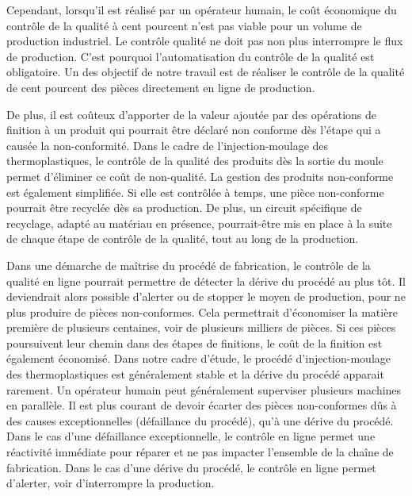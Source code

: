 Cependant, lorsqu'il est réalisé par un opérateur humain, le coût économique du contrôle de la qualité à cent pourcent n'est pas viable pour un volume de production industriel.
Le contrôle qualité ne doit pas non plus interrompre le flux de production.
C'est pourquoi l'automatisation du contrôle de la qualité est obligatoire.
Un des objectif de notre travail est de réaliser le contrôle de la qualité de cent pourcent des pièces directement en ligne de production.

De plus, il est coûteux d'apporter de la valeur ajoutée par des opérations de finition à un produit qui pourrait être déclaré non conforme dès l'étape qui a causée la non-conformité.
Dans le cadre de l'injection-moulage des thermoplastiques, le contrôle de la qualité des produits dès la sortie du moule permet d'éliminer ce coût de non-qualité.
La gestion des produits non-conforme est également simplifiée.  %
Si elle est contrôlée à temps, une pièce non-conforme pourrait être recyclée dès sa production.
De plus, un circuit spécifique de recyclage, adapté au matériau en présence, pourrait-être mis en place à la suite de chaque étape de contrôle de la qualité, tout au long de la production.

Dans une démarche de maîtrise du procédé de fabrication, le contrôle de la qualité en ligne pourrait permettre de détecter la dérive du procédé au plus tôt.
Il deviendrait alors possible d'alerter ou de stopper le moyen de production, pour ne plus produire de pièces non-conformes.
Cela permettrait d'économiser la matière première de plusieurs centaines, voir de plusieurs milliers de pièces.
Si ces pièces poursuivent leur chemin dans des étapes de finitions, le coût de la finition est également économisé.
Dans notre cadre d'étude, le procédé d'injection-moulage des thermoplastiques est généralement stable et la dérive du procédé apparait rarement.
Un opérateur humain peut généralement superviser plusieurs machines en parallèle.
Il est plus courant de devoir écarter des pièces non-conformes dûs à des causes exceptionnelles (défaillance du procédé), qu'à une dérive du procédé.
Dans le cas d'une défaillance exceptionnelle, le contrôle en ligne permet une réactivité immédiate pour réparer et ne pas impacter l'ensemble de la chaîne de fabrication.
Dans le cas d'une dérive du procédé, le contrôle en ligne permet d'alerter, voir d'interrompre la production.

